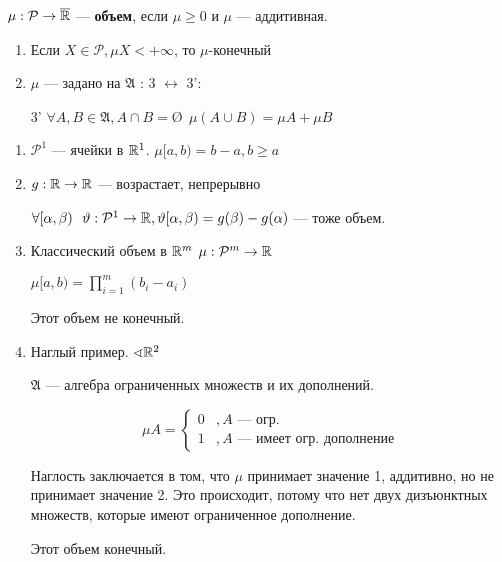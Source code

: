 \begin{definition}
    \(\mu : \mathcal{P} \to \overline {\mathbb{R}}\) --- \textbf{объем}, если \(\mu \ge 0\) и \(\mu\) --- аддитивная.
\end{definition}

\begin{remark}
    \begin{enumerate}
        \item Если \(X\in \mathcal{P}, \mu X < +\infty\), то \(\mu\)-конечный %
        \item \(\mu\) --- задано на \(\mathfrak{A}\) : 3 \(\leftrightarrow\) 3':
        \item [3'] \(\forall A, B\in \mathfrak{A}, A\cap B =\text{\O} \ \ \mu(A\cup B) = \mu A + \mu B\)
    \end{enumerate}
\end{remark}

\begin{example}
    \begin{enumerate}
        \item \(\mathcal{P}^1\) --- ячейки в \(\mathbb{R}^1\). \(\mu[a, b) = b - a, b\ge a\)


        \item \(g : \mathbb{R} \to \mathbb{R}\) --- возрастает, непрерывно

              \(\forall [\alpha, \beta) \ \ \vartheta : \mathcal{P}^1 \to \mathbb{R}, \vartheta [\alpha, \beta) = g(\beta) - g(\alpha)\) --- тоже объем.

        \item Классический объем в \(\mathbb{R}^m\) \(\mu : \mathcal{P}^m \to \mathbb{R}\)

              \(\mu [a, b) = \prod\limits_{i = 1}^m (b_i - a_i)\)

              Этот объем не конечный.
        \item Наглый пример. \(\sphericalangle \mathbb{R}^2\)

              \(\mathfrak{A}\) --- алгебра ограниченных множеств и их дополнений.

              \[\mu A = \begin{cases}
                      0 & , A \text{ --- огр.}                  \\
                      1 & , A \text{ --- имеет огр. дополнение}
                  \end{cases}\]

              Наглость заключается в том, что \(\mu\) принимает значение 1, аддитивно, но не принимает значение 2. Это происходит, потому что нет двух дизъюнктных множеств, которые имеют ограниченное дополнение.

              Этот объем конечный.
    \end{enumerate}
\end{example}


